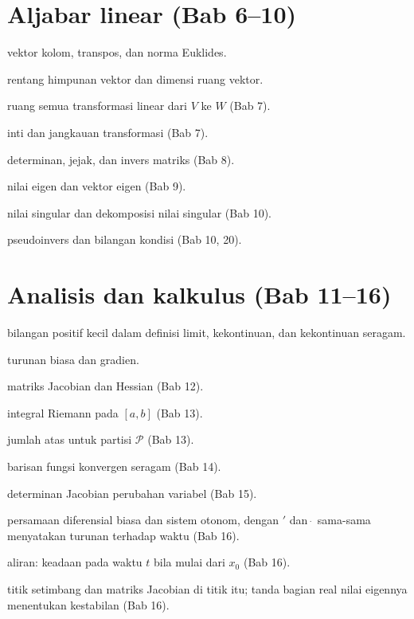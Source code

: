 \section*{Aljabar linear (Bab 6--10)}
\begin{description}[style=nextline,itemsep=0.25em]
  \item[$\mathbf{x}$, $\mathbf{x}^{\top}$, $\|\mathbf{x}\|$] vektor kolom,
        transpos, dan norma Euklides.
  \item[$\operatorname{span} S$, $\dim V$] rentang himpunan vektor dan dimensi
        ruang vektor.
  \item[$\mathcal{L}(V,W)$] ruang semua transformasi linear dari $V$ ke $W$ (Bab 7).
  \item[$\ker T$, $\operatorname{im} T$] inti dan jangkauan transformasi (Bab 7).
  \item[$\det A$, $\operatorname{tr} A$, $A^{-1}$] determinan, jejak, dan invers
        matriks (Bab 8).
  \item[$\lambda$, $\mathbf{v}$] nilai eigen dan vektor eigen (Bab 9).
  \item[$\sigma_i$, $A=U\Sigma V^{\top}$] nilai singular dan dekomposisi nilai
        singular (Bab 10).
  \item[$A^{+}$, $\kappa(A)$] pseudoinvers dan bilangan kondisi (Bab 10, 20).
\end{description}

\section*{Analisis dan kalkulus (Bab 11--16)}
\begin{description}[style=nextline,itemsep=0.25em]
  \item[$\varepsilon$, $\delta$] bilangan positif kecil dalam definisi limit,
        kekontinuan, dan kekontinuan seragam.
  \item[$f'(x)$, $\nabla f$] turunan biasa dan gradien.
  \item[$J_f$, $H_f$] matriks Jacobian dan Hessian (Bab 12).
  \item[$\int_a^b f$] integral Riemann pada $[a,b]$ (Bab 13).
  \item[$\sum_{\mathcal{P}} M_i \Delta x_i$] jumlah atas untuk partisi
        $\mathcal{P}$ (Bab 13).
  \item[$f_n \rightrightarrows f$] barisan fungsi konvergen seragam (Bab 14).
  \item[$\dfrac{\partial(x,y)}{\partial(u,v)}$] determinan Jacobian perubahan
        variabel (Bab 15).
  \item[$x'=f(t,x)$, $\dot{x}=F(x)$] persamaan diferensial biasa dan sistem
        otonom, dengan $'$ dan $\dot{\ }$ sama-sama menyatakan turunan terhadap
        waktu (Bab 16).
  \item[$\varphi_t(x_0)$] aliran: keadaan pada waktu $t$ bila mulai dari $x_0$
        (Bab 16).
  \item[$x^{*}$, $J_F(x^{*})$] titik setimbang dan matriks Jacobian di titik itu;
        tanda bagian real nilai eigennya menentukan kestabilan (Bab 16).
\end{description}

